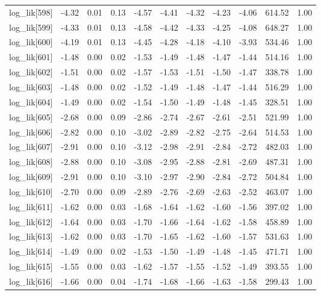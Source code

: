\begin{table}[ht]
\begin{tabular}{rrrrrrrrrrr}
  log\_lik[598] & -4.32 & 0.01 & 0.13 & -4.57 & -4.41 & -4.32 & -4.23 & -4.06 & 614.52 & 1.00 \\ 
  log\_lik[599] & -4.33 & 0.01 & 0.13 & -4.58 & -4.42 & -4.33 & -4.25 & -4.08 & 648.27 & 1.00 \\ 
  log\_lik[600] & -4.19 & 0.01 & 0.13 & -4.45 & -4.28 & -4.18 & -4.10 & -3.93 & 534.46 & 1.00 \\ 
  log\_lik[601] & -1.48 & 0.00 & 0.02 & -1.53 & -1.49 & -1.48 & -1.47 & -1.44 & 514.16 & 1.00 \\ 
  log\_lik[602] & -1.51 & 0.00 & 0.02 & -1.57 & -1.53 & -1.51 & -1.50 & -1.47 & 338.78 & 1.00 \\ 
  log\_lik[603] & -1.48 & 0.00 & 0.02 & -1.52 & -1.49 & -1.48 & -1.47 & -1.44 & 516.29 & 1.00 \\ 
  log\_lik[604] & -1.49 & 0.00 & 0.02 & -1.54 & -1.50 & -1.49 & -1.48 & -1.45 & 328.51 & 1.00 \\ 
  log\_lik[605] & -2.68 & 0.00 & 0.09 & -2.86 & -2.74 & -2.67 & -2.61 & -2.51 & 521.99 & 1.00 \\ 
  log\_lik[606] & -2.82 & 0.00 & 0.10 & -3.02 & -2.89 & -2.82 & -2.75 & -2.64 & 514.53 & 1.00 \\ 
  log\_lik[607] & -2.91 & 0.00 & 0.10 & -3.12 & -2.98 & -2.91 & -2.84 & -2.72 & 482.03 & 1.00 \\ 
  log\_lik[608] & -2.88 & 0.00 & 0.10 & -3.08 & -2.95 & -2.88 & -2.81 & -2.69 & 487.31 & 1.00 \\ 
  log\_lik[609] & -2.91 & 0.00 & 0.10 & -3.10 & -2.97 & -2.90 & -2.84 & -2.72 & 504.84 & 1.00 \\ 
  log\_lik[610] & -2.70 & 0.00 & 0.09 & -2.89 & -2.76 & -2.69 & -2.63 & -2.52 & 463.07 & 1.00 \\ 
  log\_lik[611] & -1.62 & 0.00 & 0.03 & -1.68 & -1.64 & -1.62 & -1.60 & -1.56 & 397.02 & 1.00 \\ 
  log\_lik[612] & -1.64 & 0.00 & 0.03 & -1.70 & -1.66 & -1.64 & -1.62 & -1.58 & 458.89 & 1.00 \\ 
  log\_lik[613] & -1.62 & 0.00 & 0.03 & -1.70 & -1.65 & -1.62 & -1.60 & -1.57 & 531.63 & 1.00 \\ 
  log\_lik[614] & -1.49 & 0.00 & 0.02 & -1.53 & -1.50 & -1.49 & -1.48 & -1.45 & 471.71 & 1.00 \\ 
  log\_lik[615] & -1.55 & 0.00 & 0.03 & -1.62 & -1.57 & -1.55 & -1.52 & -1.49 & 393.55 & 1.00 \\ 
  log\_lik[616] & -1.66 & 0.00 & 0.04 & -1.74 & -1.68 & -1.66 & -1.63 & -1.58 & 299.43 & 1.00 \\ 

\end{tabular}
\end{table}
